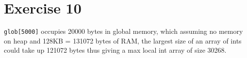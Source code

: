 \documentclass[12pt]{article}
\begin{document}
\section*{Exercise 10}
\verb|glob[5000]| occupies 20000 bytes in global memory, which assuming no memory on heap and 128KB = 131072 bytes of RAM, the largest size of an array of ints could take up 121072 bytes thus giving a max local int array of size 30268.
\end{document}
